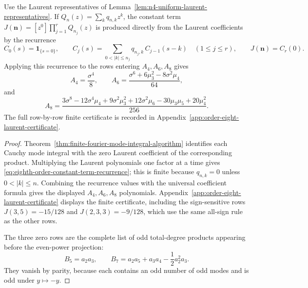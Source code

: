 \begin{lemma}%
\label{lem:eighth-order-coefficient-arithmetic}
Use the Laurent representatives of
Lemma~\ref{lem:n4-uniform-laurent-representatives}.  If
\(Q_n(z)=\sum_kq_{n,k}z^k\), the constant term
\(J(\mathbf n)=[z^0]\prod_{j=1}^rQ_{n_j}(z)\) is produced directly from the
Laurent coefficients by the recurrence
\begin{equation}\label{eq:eighth-order-constant-term-recurrence}
C_0(s)=\mathbf 1_{\{s=0\}},\qquad
C_j(s)=\sum_{0<|k|\le n_j}q_{n_j,k}\,C_{j-1}(s-k)
\quad(1\le j\le r),\qquad J(\mathbf n)=C_r(0).
\end{equation}
Applying this recurrence to the rows entering \(A_4,A_6,A_8\) gives
\[
A_4=\frac{\sigma^4}{8},\qquad
A_6=\frac{\sigma^6+6\mu_3^2-8\sigma^2\mu_4}{64},
\]
and
\[
A_8=
\frac{3\sigma^8-12\sigma^4\mu_4+9\sigma^2\mu_3^2
+12\sigma^2\mu_6-30\mu_3\mu_5+20\mu_4^2}{256}.
\]
The full row-by-row finite certificate is recorded in
Appendix~\ref{app:order-eight-laurent-certificate}.
\end{lemma}

\begin{proof}
Theorem~\ref{thm:finite-fourier-mode-integral-algorithm} identifies each
Cauchy mode integral with the zero Laurent coefficient of the corresponding
product.  Multiplying the Laurent polynomials one factor at a time gives
\eqref{eq:eighth-order-constant-term-recurrence}; this is finite because
\(q_{n,k}=0\) unless \(0<|k|\le n\).  Combining the recurrence values with
the universal coefficient formula gives the displayed \(A_4,A_6,A_8\)
polynomials.  Appendix~\ref{app:order-eight-laurent-certificate} displays
the finite certificate, including the sign-sensitive rows \(J(3,5)=-15/128\)
and \(J(2,3,3)=-9/128\), which use the same all-sign rule as the other rows.

The three zero rows are the complete list of odd total-degree products
appearing before the even-power projection:
\[
B_5=a_2a_3,\qquad
B_7=a_2a_5+a_3a_4-\frac12a_2^2a_3 .
\]
They vanish by parity, because each contains an odd number of odd modes and
is odd under \(y\mapsto-y\).
\end{proof}

